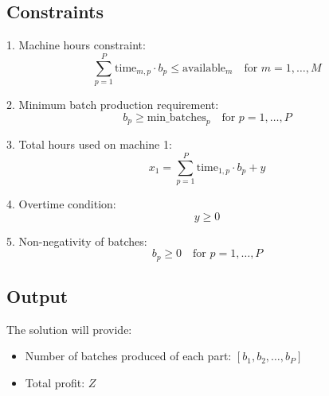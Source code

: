 \documentclass{article}
\begin{document}
\subsection*{Constraints}

1. Machine hours constraint:
\[
\sum_{p=1}^{P} \text{time}_{m,p} \cdot b_p \leq \text{available}_m \quad \text{for } m = 1, \ldots, M
\]

2. Minimum batch production requirement:
\[
b_p \geq \text{min\_batches}_p \quad \text{for } p = 1, \ldots, P
\]

3. Total hours used on machine 1:
\[
x_1 = \sum_{p=1}^{P} \text{time}_{1,p} \cdot b_p + y
\]

4. Overtime condition:
\[
y \geq 0
\]

5. Non-negativity of batches:
\[
b_p \geq 0 \quad \text{for } p = 1, \ldots, P
\]

\subsection*{Output}
The solution will provide:
\begin{itemize}
    \item Number of batches produced of each part: \( [b_1, b_2, \ldots, b_P] \)
    \item Total profit: \( Z \)
\end{itemize}
\end{document}

